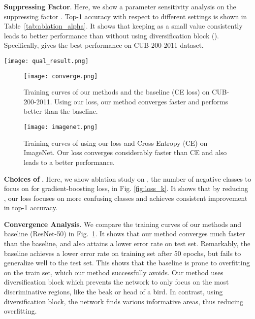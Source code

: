 \documentclass[letterpaper]{article} \usepackage{aaai20}  \usepackage{times}  \usepackage{helvet} \usepackage{courier}  \usepackage[hyphens]{url}  \usepackage{graphicx} \usepackage{multirow}
\begin{document}
\textbf{Suppressing Factor}.
Here, we show a parameter sensitivity analysis on the suppressing factor . Top-1 accuracy with respect to different  settings is shown in Table~\ref{tab:ablation_alpha}. It shows that keeping  as a small value consistently leads to better performance than without using diversification block (). Specifically,  gives the best performance on CUB-200-2011 dataset.
\begin{figure*}[t]
\centering
\texttt{[image: qual\_result.png]}\\
\caption{Class activation map (CAM) comparison between our method and baseline in different datasets. \emph{Top} to \emph{below}: original image, CAM of the ground-truth class of baseline, CAM of the ground-truth class of our method. While baseline only focuses on the most discriminative region, our method accurately diversifies attentions to other informative regions of the objects. }
\label{Fig:qual_result}
\end{figure*}
\begin{figure}[htp]
\centering
\texttt{[image: converge.png]}\\
\caption{Training curves of our methods and the baseline (CE loss) on CUB-200-2011. Using our loss, our method converges faster and performs better than the baseline.}
	\label{fig:converge}
\end{figure}
\begin{figure}[t]
\centering
\texttt{[image: imagenet.png]}\\
	\caption{Training curves of using our loss and Cross Entropy (CE) on ImageNet. Our loss converges considerably faster than CE and also leads to a better performance. 
	}
	\label{fig:imagenet}
\end{figure}

\textbf{Choices of }.
Here, we show ablation study on , the number of negative classes to focus on for gradient-boosting loss, in Fig. \ref{fig:loss_k}. It shows that by reducing , our loss focuses on more confusing classes and achieves consistent improvement in top-1 accuracy. 

\textbf{Convergence Analysis}.
We compare the training curves of our methods and baseline (ResNet-50) in Fig.~\ref{fig:converge}. It shows that our method converges much faster than the baseline, and also attains a lower error rate on test set. Remarkably, the baseline achieves a lower error rate on training set after 50 epochs, but fails to generalize well to the test set. This shows that the baseline is prone to overfitting on the train set, which our method successfully avoids. Our method uses diversification block which prevents the network to only focus on the most discriminative regions, like the beak or head of a bird. In contrast, using diversification block, the network finds various informative areas, thus reducing overfitting.
\end{document}
